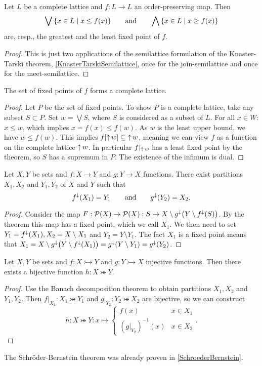 \begin{theorem}
Let $L$ be a complete lattice and $f:L\to L$ an order-preserving map. Then 
\[ \bigvee \setbuilder{x\in L}{x\leq f(x)} \qquad\text{and}\qquad \bigwedge \setbuilder{x\in L}{x\geq f(x)} \]
are, resp., the greatest and the least fixed point of $f$.
\end{theorem}
\begin{proof}
This is just two applications of the semilattice formulation of the Knaster-Tarski theorem, \ref{KnasterTarskiSemilattice}, once for the join-semilattice and once for the meet-semilattice.
\end{proof}
\begin{corollary}
The set of fixed points of $f$ forms a complete lattice.
\end{corollary}
\begin{proof}
Let $P$ be the set of fixed points. To show $P$ is a complete lattice, take any subset $S\subset P$.
Set $w = \bigvee S$, where $S$ is considered as a subset of $L$. For all $x\in W$: $x\leq w$, which implies $x=f(x)\leq f(w)$. As $w$ is the least upper bound, we have $w\leq f(w)$. This implies $f[\operatorname{\uparrow} w]\subseteq \operatorname{\uparrow} w$, meaning we can view $f$ as a function on the complete lattice $\operatorname{\uparrow} w$. In particular $f|_{\operatorname{\uparrow} w}$ has a least fixed point by the theorem, so $S$ has a supremum in $P$. The existence of the infimum is dual.
\end{proof}
\begin{corollary}
Let $X,Y$ be sets and $f:X\to Y$ and $g:Y\to X$ functions. There exist partitions $X_1,X_2$ and $Y_1,Y_2$ of $X$ and $Y$ such that
\[ f^\downarrow(X_1) = Y_1 \qquad\text{and}\qquad g^\downarrow(Y_2) = X_2. \]
\end{corollary}
\begin{proof}
Consider the map $F: \operatorname{\mathcal{P}}(X)\to\operatorname{\mathcal{P}}(X): S\mapsto X\setminus g^\downarrow\big(Y\setminus f^\downarrow(S)\big)$. By the theorem this map has a fixed point, which we call $X_1$. We then need to set $Y_1 = f^\downarrow(X_1), X_2 = X\setminus X_1$ and $Y_2 = Y\setminus Y_1$. The fact $X_1$ is a fixed point means that $X_1 = X\setminus g^\downarrow\big(Y\setminus f^\downarrow(X_1)\big) = g^\downarrow(Y\setminus Y_1) = g^\downarrow(Y_2)$.
\end{proof}
\begin{corollary}
Let $X,Y$ be sets and $f:X\rightarrowtail Y$ and $g:Y\rightarrowtail X$ injective functions. Then there exists a bijective function $h: X\twoheadrightarrowtail Y$.
\end{corollary}
\begin{proof}
Use the Banach decomposition theorem to obtain partitions $X_1,X_2$ and $Y_1,Y_2$. Then $f|_{X_1}: X_1\twoheadrightarrowtail Y_1$ and $g|_{Y_2}: Y_2 \twoheadrightarrowtail X_2$ are bijective, so we can construct
\[ h: X\twoheadrightarrowtail Y: x \mapsto \begin{cases}
f(x) & x\in X_1 \\ (g|_{Y_2})^{-1}(x) & x\in X_2
\end{cases}. \]
\end{proof}
The Schröder-Bernstein theorem was already proven in \ref{SchroederBernstein}.

